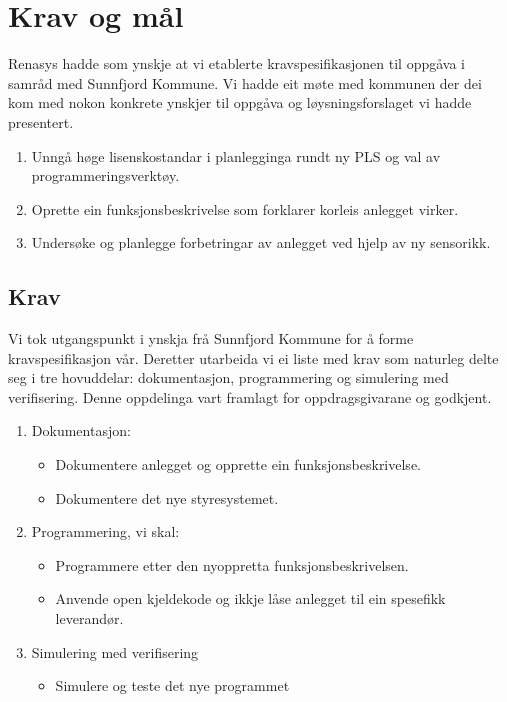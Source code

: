 \chapter{Krav og mål}
\thispagestyle{fancy}
\gls{Renasys} hadde som ynskje at vi etablerte kravspesifikasjonen til oppgåva 
i samråd med \gls{Sunnfjord Kommune}. \newline
Vi hadde eit møte med kommunen der dei kom med nokon konkrete ynskjer til oppgåva
og løysningsforslaget vi hadde presentert.

\begin{enumerate}
    \item Unngå høge lisenskostandar i planlegginga rundt ny PLS og val av programmeringsverktøy.
    \item Oprette ein funksjonsbeskrivelse som forklarer korleis anlegget virker.
    \item Undersøke og planlegge forbetringar av anlegget ved hjelp av ny sensorikk.
\end{enumerate}


\section{Krav}
Vi tok utgangspunkt i ynskja frå \gls{Sunnfjord Kommune} for å forme kravspesifikasjon vår.
Deretter utarbeida vi ei liste med krav som naturleg delte seg i tre
hovuddelar: dokumentasjon, programmering og simulering med verifisering. 
Denne oppdelinga vart framlagt for oppdragsgivarane og godkjent. 

\begin{enumerate}
    \item Dokumentasjon:
    \begin{itemize}
        \item Dokumentere anlegget og opprette ein funksjonsbeskrivelse.
        \item Dokumentere det nye styresystemet.
    \end{itemize}
    \item Programmering, vi skal:
    \begin{itemize}
        \item Programmere etter den nyoppretta funksjonsbeskrivelsen.
        \item Anvende open kjeldekode og ikkje låse anlegget til ein spesefikk leverandør.
    \end{itemize}
    \item Simulering med verifisering
    \begin{itemize}
        \item Simulere og teste det nye programmet
    \end{itemize}
\end{enumerate}


